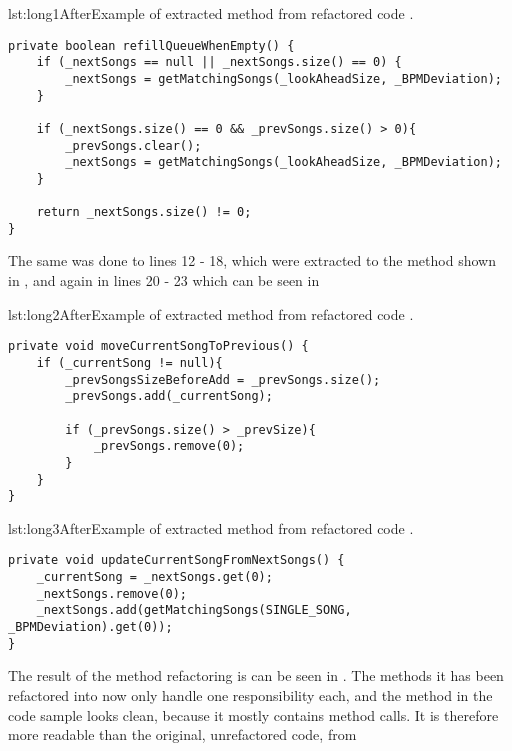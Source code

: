 
\begin{code}{lst:long1After}{Example of extracted method from refactored code .}
\begin{lstlisting}
private boolean refillQueueWhenEmpty() {
    if (_nextSongs == null || _nextSongs.size() == 0) {
        _nextSongs = getMatchingSongs(_lookAheadSize, _BPMDeviation);
    }
    
    if (_nextSongs.size() == 0 && _prevSongs.size() > 0){
        _prevSongs.clear();
        _nextSongs = getMatchingSongs(_lookAheadSize, _BPMDeviation);
    }
    
    return _nextSongs.size() != 0;
}
\end{lstlisting}
\end{code}


The same was done to lines 12 - 18, which were extracted to the method shown in , and again in lines 20 - 23 which can be seen in 


\begin{code}{lst:long2After}{Example of extracted method from refactored code .}
\begin{lstlisting}
private void moveCurrentSongToPrevious() {
    if (_currentSong != null){
        _prevSongsSizeBeforeAdd = _prevSongs.size();
        _prevSongs.add(_currentSong);

        if (_prevSongs.size() > _prevSize){
            _prevSongs.remove(0);
        }
    }
}
\end{lstlisting}
\end{code}


\begin{code}{lst:long3After}{Example of extracted method from refactored code .}
\begin{lstlisting}
private void updateCurrentSongFromNextSongs() {
    _currentSong = _nextSongs.get(0);
    _nextSongs.remove(0);
    _nextSongs.add(getMatchingSongs(SINGLE_SONG, _BPMDeviation).get(0));
}
\end{lstlisting}
\end{code}


The result of the method refactoring is can be seen in . The methods it has been refactored into now only handle one responsibility each, and the method in the code sample looks clean, because it mostly contains method calls. It is therefore more readable than the original, unrefactored code, from 


